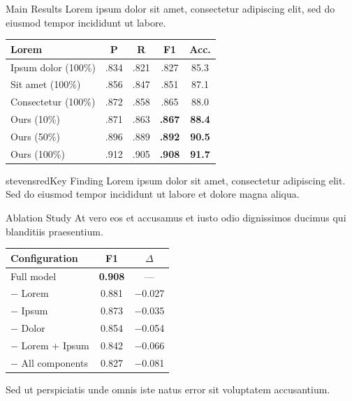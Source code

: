 
\begin{block}{Main Results}
Lorem ipsum dolor sit amet, consectetur adipiscing elit, sed do eiusmod tempor incididunt ut labore.

\vspace{0.4em}
\centering
\setlength{\tabcolsep}{4pt}
\begin{tabular}{@{}lcccc@{}}
\toprule
\textbf{Lorem} & \textbf{P} & \textbf{R} & \textbf{F1} & \textbf{Acc.} \\
\midrule
Ipsum dolor (100\%)   & .834 & .821 & .827 & 85.3 \\
Sit amet (100\%)      & .856 & .847 & .851 & 87.1 \\
Consectetur (100\%)   & .872 & .858 & .865 & 88.0 \\
\midrule
Ours (10\%)           & .871 & .863 & \textbf{.867} & \textbf{88.4} \\
Ours (50\%)           & .896 & .889 & \textbf{.892} & \textbf{90.5} \\
Ours (100\%)          & .912 & .905 & \textbf{.908} & \textbf{91.7} \\
\bottomrule
\end{tabular}
\end{block}

\begin{colorblock}[white]{stevensred}{Key Finding}
Lorem ipsum dolor sit amet, consectetur adipiscing elit. Sed do eiusmod tempor incididunt ut labore et dolore magna aliqua.
\end{colorblock}

\begin{block}{Ablation Study}
At vero eos et accusamus et iusto odio dignissimos ducimus qui blanditiis praesentium.

\vspace{0.4em}
\centering
\begin{tabular}{lcc}
\toprule
\textbf{Configuration} & \textbf{F1} & \textbf{$\Delta$} \\
\midrule
Full model            & \textbf{0.908} & --- \\
$-$ Lorem             & 0.881 & $-$0.027 \\
$-$ Ipsum             & 0.873 & $-$0.035 \\
$-$ Dolor             & 0.854 & $-$0.054 \\
$-$ Lorem + Ipsum     & 0.842 & $-$0.066 \\
$-$ All components    & 0.827 & $-$0.081 \\
\bottomrule
\end{tabular}

\vspace{0.4em}
\raggedright Sed ut perspiciatis unde omnis iste natus error sit voluptatem accusantium.
\end{block}

